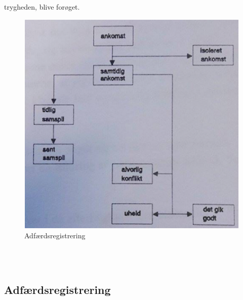 trygheden,	blive	forøget.
\begin{figure}[htbp]
  \label{fig:adfreg}
  \centering
  \begin{adjustbox}{max width=\textwidth}
    \includegraphics[scale=0.7]{billederogfigur/adfaerdsreg.png} %
 \end{adjustbox}
  \caption{Adfærdsregistrering}
\end{figure}
\\\
\subsection{Adfærdsregistrering}
\label{sub:adfregis}

